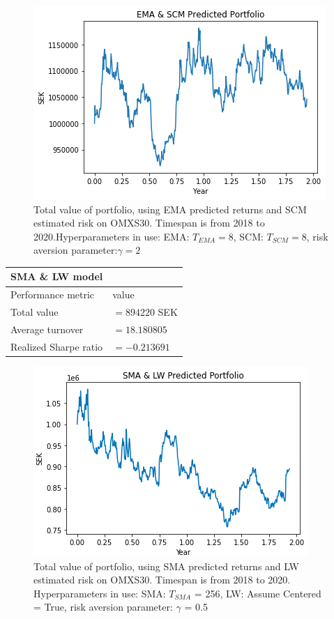 \documentclass[final]{LTHtwocol} %
\begin{document}
\begin{figure}[h]
	\centering
	\includegraphics[width=0.8\columnwidth]{Pics/result/EMA_SCM.png}
	\caption{Total value of portfolio, using EMA predicted returns and SCM estimated risk on OMXS30. Timespan is from 2018 to 2020.Hyperparameters in use: EMA: $T_{EMA} =8$, SCM: $T_{SCM} = 8$, risk aversion parameter:$\gamma= 2$}
	\label{fig:EMASCM} 
\end{figure}



\begin{center}
 \begin{tabular}{||l l||} 
 \hline
 \textbf{SMA \& LW  model} & \\ [0.5ex] 
 \hline
 Performance metric & value\\ [0.5ex] 
 \hline\hline
 Total value & $=894220$ SEK \\ 
 \hline
 Average turnover& $=18.180805$ \\
 \hline
 Realized Sharpe ratio & $=-0.213691$ \\  [1ex] 
 \hline
\end{tabular}
\label{tab:SMA and LW data}
\end{center}

\begin{figure}[h]
	\centering
	\includegraphics[width=0.8\columnwidth]{Pics/result/SMA_LW_Diagram.png}
	\caption{Total value of portfolio, using SMA predicted returns and LW estimated risk on OMXS30. Timespan is from 2018 to 2020. Hyperparameters in use: SMA: $T_{SMA}$ = 256, LW: Assume Centered = True, risk aversion parameter: $\gamma$ = 0.5}
	\label{fig:SMALW} 
\end{figure}
\end{document}
